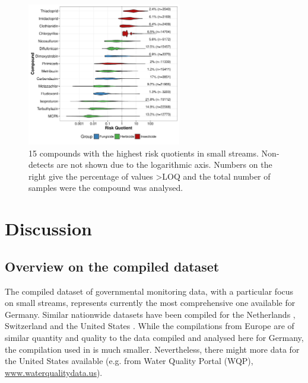 \documentclass[journal=esthag,manuscript=article]{achemso}
\begin{document}
\begin{figure}[ht]
  \includegraphics[width=0.6\textwidth]{figure6.pdf}
  \caption{15 compounds with the highest risk quotients in small streams. Non-detects are not shown due to the logarithmic axis. Numbers on the right give the percentage of values \textgreater LOQ and the total number of samples were the compound was analysed.
  }
  \label{fig:fig6}
\end{figure}




\section{Discussion}
\subsection{Overview on the compiled dataset}
The compiled dataset of governmental monitoring data, with a particular focus on small streams, represents currently the most comprehensive one available for Germany.
Similar nationwide datasets have been compiled for the Netherlands \citep{vijver_spatial_2008}, Switzerland \citep{munz_pestizidmessungen_2011} and the United States \citep{stone2014pesticides}.
While the compilations from Europe are of similar quantity and quality to the  data compiled and analysed here for Germany, the compilation used in \citet{stone2014pesticides} is much smaller.
Nevertheless, there might more data for the United States available (e.g. from Water Quality Portal (WQP), \url{www.waterqualitydata.us}). 
\end{document}
